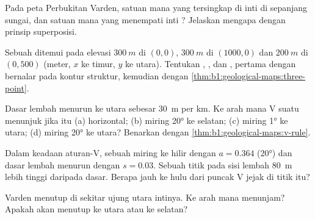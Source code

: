 \begin{exercise}[$\star$]\label{exo:b1:geological-maps:4}
Pada peta Perbukitan Varden, satuan mana yang tersingkap di inti  di sepanjang sungai, dan satuan mana yang menempati inti ? Jelaskan mengapa dengan prinsip superposisi.
\end{exercise}

\begin{exercise}[$\star\star$]\label{exo:b1:geological-maps:5}
Sebuah  ditemui pada elevasi $\qty{300}{m}$ di $(0, 0)$, $\qty{300}{m}$ di
$(1000, 0)$ dan $\qty{200}{m}$ di $(0, 500)$ (meter, $x$ ke timur, $y$ ke utara). Tentukan , , dan , pertama dengan bernalar pada kontur struktur, kemudian dengan \cref{thm:b1:geological-maps:three-point}.
\end{exercise}

\begin{exercise}[$\star\star$]\label{exo:b1:geological-maps:6}
Dasar lembah menurun ke utara sebesar \qty{30}{m} per km. Ke arah mana V  suatu  menunjuk jika  itu (a) horizontal; (b) miring \ang{20} ke selatan; (c) miring \ang{1} ke utara; (d) miring \ang{20} ke utara? Benarkan dengan \cref{thm:b1:geological-maps:v-rule}.
\end{exercise}

\begin{exercise}[$\star\star$]\label{exo:b1:geological-maps:7}
Dalam keadaan aturan-V, sebuah  miring ke hilir dengan $a = 0.364$ (\ang{20}) dan dasar lembah menurun dengan $s = 0.03$. Sebuah titik pada sisi lembah \qty{80}{m} lebih tinggi daripada dasar. Berapa jauh ke hulu dari puncak V jejak di titik itu?
\end{exercise}

\begin{exercise}[$\star\star$]\label{exo:b1:geological-maps:8}
  Varden menutup di sekitar ujung utara intinya. Ke arah mana  menunjam? Apakah   akan menutup ke utara atau ke selatan?
\end{exercise}

